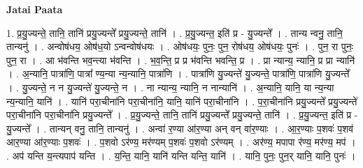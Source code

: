 \documentclass[17pt]{extarticle}
\begin{document}
\textbf{Jatai Paata} \newline

1. प्र॒यु॒ज्यन्ते॒ तानि॒ तानि॑ प्रयु॒ज्यन्ते᳚ प्रयु॒ज्यन्ते॒ तानि॑ । . प्र॒यु॒ज्यन्त॒ इति॑ प्र - यु॒ज्यन्ते᳚ । . तान्य न्वनु॒ तानि॒ तान्यनु॑ । . अन्वोष॑धय॒ ओष॑ध॒यो ऽन्वन्वोष॑धयः । . ओष॑धयः॒ पुनः॒ पुन॒ रोष॑धय॒ ओष॑धयः॒ पुनः॑ । . पुन॒ रा पुनः॒ पुन॒ रा । . आ भ॑वन्ति भव॒न्त्या भ॑वन्ति । . भ॒व॒न्ति॒ प्र प्र भ॑वन्ति भवन्ति॒ प्र । . प्रा न्यान्य॒ न्यानि॒ प्र प्रा न्यानि॑ । . अ॒न्यानि॒ पात्रा॑णि॒ पात्रा᳚ ण्य॒न्या न्य॒न्यानि॒ पात्रा॑णि । . पात्रा॑णि यु॒ज्यन्ते॑ यु॒ज्यन्ते॒ पात्रा॑णि॒ पात्रा॑णि यु॒ज्यन्ते᳚ । . यु॒ज्यन्ते॒ न न यु॒ज्यन्ते॑ यु॒ज्यन्ते॒ न । . ना न्यान्य॒ न्यानि॒ न नान्यानि॑ । . अ॒न्यानि॒ यानि॒ या न्य॒न्या न्य॒न्यानि॒ यानि॑ । . यानि॑ परा॒चीना॑नि परा॒चीना॑नि॒ यानि॒ यानि॑ परा॒चीना॑नि । . प॒रा॒चीना॑नि प्रयु॒ज्यन्ते᳚ प्रयु॒ज्यन्ते॑ परा॒चीना॑नि परा॒चीना॑नि प्रयु॒ज्यन्ते᳚ । . प्र॒यु॒ज्यन्ते॒ तानि॒ तानि॑ प्रयु॒ज्यन्ते᳚ प्रयु॒ज्यन्ते॒ तानि॑ । . प्र॒यु॒ज्यन्त॒ इति॑ प्र - यु॒ज्यन्ते᳚ । . तान्यन् वनु॒ तानि॒ तान्यनु॑ । . अन्वा॑ र॒ण्या आ॑र॒ण्या अन् वन् वा॑र॒ण्याः । . आ॒र॒ण्याः प॒शवः॑ प॒शव॑ आर॒ण्या आ॑र॒ण्याः प॒शवः॑ । . प॒शवो ऽर॑ण्य॒ मर॑ण्यम् प॒शवः॑ प॒शवो ऽर॑ण्यम् । . अर॑ण्य॒ मपापा र॑ण्य॒ मर॑ण्य॒ मप॑ । . अप॑ यन्ति य॒न्त्यपाप॑ यन्ति । . य॒न्ति॒ यानि॒ यानि॑ यन्ति यन्ति॒ यानि॑ । . यानि॒ पुनः॒ पुन॒र् यानि॒ यानि॒ पुनः॑ । \newline
\end{document}
